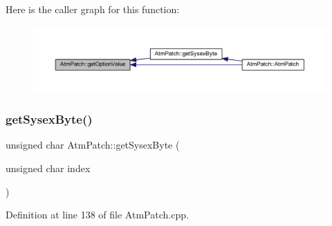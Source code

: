 Here is the caller graph for this function\+:
\nopagebreak
\begin{figure}[H]
\begin{center}
\leavevmode
\includegraphics[width=350pt]{class_atm_patch_ab521c0a108bf7f8bc848755c38330bc0_icgraph}
\end{center}
\end{figure}
\mbox{\label{class_atm_patch_a48b5b2d71e4b83b80979a68372e935ae}} 
\subsubsection{\texorpdfstring{get\+Sysex\+Byte()}{getSysexByte()}}
{\footnotesize\ttfamily unsigned char Atm\+Patch\+::get\+Sysex\+Byte (\begin{DoxyParamCaption}\item[{unsigned char}]{index }\end{DoxyParamCaption})}



Definition at line 138 of file Atm\+Patch.\+cpp.

